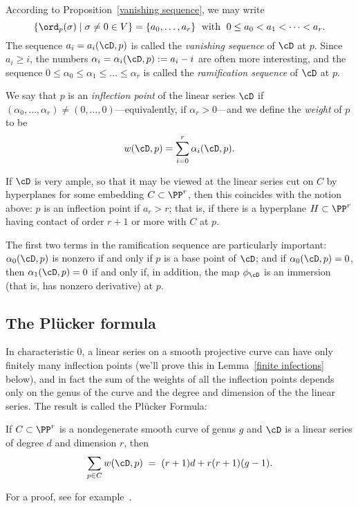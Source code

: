 According to  Proposition~\ref{vanishing sequence}, we may write
$$
\{ \ord_p(\sigma) \mid \sigma \neq 0 \in V \} = \{a_0,\dots,a_r\} \; \text{ with } \; 0\leq a_0 < a_1 < \dots < a_r.
$$
The sequence $a_i = a_i(\cD,p)$ is called the \emph{vanishing sequence} of $\cD$ at $p$.  Since $a_i \geq i$, the numbers $\alpha_i = \alpha_i(\cD,p) := a_i - i$ are often more interesting, and the sequence $0 \leq \alpha_0 \leq \alpha_1 \leq \dots \leq \alpha_r$ is called the \emph{ramification sequence} of $\cD$ at $p$. 

We say that $p$ is an \emph{inflection point} of the linear series $\cD$ if $(\alpha_0,\dots,\alpha_r) \neq (0,\dots,0)$---equivalently, if $\alpha_r > 0$---and we define the \emph{weight} of $p$ to be
$$
w(\cD, p) = \sum_{i=0}^r \alpha_i(\cD, p).
$$

If $\cD$ is very ample, so that it may be viewed at the linear series cut on $C$ by hyperplanes for some embedding $C \subset \PP^r$, then this coincides with the notion above: $p$ is an inflection point if $a_r > r$; that is, if there is a hyperplane $H \subset \PP^r$ having contact of order $r+1$ or more with $C$ at $p$.

The first two terms in the ramification sequence are particularly important: $\alpha_0(\cD, p)$ is nonzero if and only if $p$ is a base point of $\cD$; and if $\alpha_0(\cD, p)=0$, then $\alpha_1(\cD, p) = 0$ if and only if, in addition, the map $\phi_\cD$ is an immersion (that is, has nonzero derivative) at $p$.


\subsection{The Pl\"ucker formula}

In characteristic 0, a linear series on a smooth projective curve can have only finitely many inflection points (we'll prove this in Lemma~\ref{finite infections} below), and in fact the sum of the weights of all the inflection points depends only on the genus of the curve and the degree and dimension of the the linear series. The result is called the Pl\"ucker Formula:

\begin{theorem}\label{Plucker}
If $C \subset \PP^r$ is a nondegenerate smooth curve of genus $g$ and $\cD$ is a
linear series of degree $d$ and dimension $r$, then
 \begin{equation}\label{Plucker formula}
\sum_{p \in C} w(\cD, p) \; = \; (r+1)d + r(r+1)(g-1).
\end{equation}
\end{theorem}
For a proof, see for example~\cite[Theorem 7.13]{allthat}.

